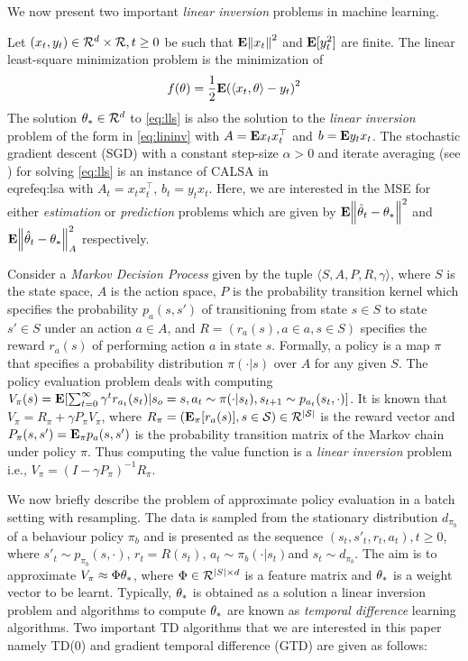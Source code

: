 {We now present two important \emph{linear inversion} problems in machine learning.
\begin{example}
Let $(x_t,y_t)\in \mathcal{R}^{d}\times \mathcal{R}, t\geq 0$ be \iid such that $\mathbf{E}{\left\| x_t\right\|^2}$ and $\mathbf{E}[y_t^2]$ are finite. The linear least-square minimization problem is the minimization of \begin{align}\label{eq:lls}
f(\theta)=\frac{1}{2}\mathbf{E}{\left(\langle x_t,\theta\rangle-y_t\right)^2}
\end{align}
The solution $\theta_*\in \mathcal{R}^d$ to \eqref{eq:lls} is also the solution to the \emph{linear inversion} problem of the form in \eqref{eq:lininv} with $A=\mathbf{E}{x_tx_t^\top}$ and $b=\mathbf{E}{y_t x_t}$. 
The stochastic gradient descent (SGD) with a constant step-size $\alpha>0$ and iterate averaging (see \citet{bach}) for solving \eqref{eq:lls} is an instance of CALSA in \\eqref{eq:lsa} with $A_t=x_tx_t^\top$, $b_t=y_t x_t$. Here, we are interested in the MSE for either \emph{estimation} or \emph{prediction} problems which are given by $\mathbf{E}{\left\| \hat{\theta}_t-\theta_*\right\|^2}$ and $\mathbf{E}{\left\| \hat{\theta}_t-\theta_*\right\|^2_A}$ respectively.
\end{example}
\begin{example}
Consider a \emph{Markov Decision Process} given by the tuple $\langle S,A,P,R,\gamma \rangle$, where $S$ is the state space, $A$ is the action space, $P$ is the probability transition kernel which specifies the probability $p_a(s,s')$ of transitioning from state $s\in S$ to state $s'\in S$ under an action $a\in A$, and $R=(r_a(s),a\in a,s\in S)$ specifies the reward $r_a(s)$ of performing action $a$ in state $s$. Formally, a policy is a map $\pi$ that specifies a probability distribution $\pi(\cdot | s)$ over $A$ for any given $S$. The policy evaluation problem deals with computing $V_\pi(s)=\mathbf{E}[\sum_{t=0}^\infty\gamma^t r_{a_t}(s_t)| s_o=s, a_t\sim\pi(\cdot|s_t), s_{t+1}\sim p_{a_t}(s_t,\cdot)]$. It is known that $V_\pi=R_\pi+\gamma P_\pi V_\pi$, where $R_\pi=(\mathbf{E}_\pi[r_a(s)],s\in\mathcal{S})\in \mathcal{R}^{|\mathcal{S}|}$ is the reward vector and $P_\pi(s,s')=\mathbf{E}_\pi p_a(s,s')$ is the probability transition matrix of the Markov chain under policy $\pi$. Thus computing the value function is a \emph{linear inversion} problem i.e., $V_\pi=(I-\gamma P_\pi)^{-1} R_\pi$.

We now briefly describe the problem of approximate policy evaluation in a batch setting with \iid resampling. The data is sampled from the stationary distribution $d_{\pi_b}$ of a behaviour policy $\pi_b$ and is presented as the sequence $(s_t,s'_t,r_t,a_t), t\geq 0$, where $s'_t\sim p_{\pi_b}(s,\cdot)$, $r_t=R(s_t)$, $a_t\sim \pi_b(\cdot | s_t)$and $s_t\sim d_{\pi_b}$. The aim is to approximate $V_\pi \approx \Phi \theta_*$, where $\Phi\in \mathcal{R}^{|S|\times d}$ is a feature matrix and $\theta_*$ is a weight vector to be learnt. Typically, $\theta_*$ is obtained as a solution a linear inversion problem and algorithms to compute $\theta_*$ are known as \emph{temporal difference} learning algorithms. Two important TD algorithms that we are interested in this paper namely  TD(0) and gradient temporal difference (GTD) are given as follows:
\FloatBarrier
\begin{table}[H]


\end{table}
\end{example}}

